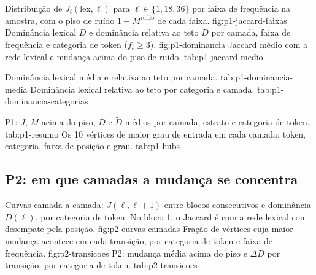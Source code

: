     {Distribuição de $J_i(\mathrm{lex},\ell)$ para $\ell\in\{1,18,36\}$ por faixa de frequência
    na amostra, com o piso de ruído $1-M^{\text{ruído}}$ de cada faixa.}
    {fig:p1-jaccard-faixas}
    {Dominância lexical $D$ e dominância relativa ao teto $\tilde D$ por camada, faixa de
    frequência e categoria de token ($f_t\ge3$).}
    {fig:p1-dominancia}
    {Jaccard médio com a rede lexical e mudança acima do piso de ruído.}
    {tab:p1-jaccard-medio}

    {Dominância lexical média e relativa ao teto por camada.}
    {tab:p1-dominancia-media}
    {Dominância lexical relativa ao teto por categoria e camada.}
    {tab:p1-dominancia-categorias}

    {P1: $J$, $M$ acima do piso, $D$ e $\tilde D$ médios por camada, estrato e categoria de
    token.}
    {tab:p1-resumo}
    {Os 10 vértices de maior grau de entrada em cada camada: token, categoria, faixa de
    posição e grau.}
    {tab:p1-hubs}

\subsection{P2: em que camadas a mudança se concentra}\label{sec:res-p2}


    {Curvas camada a camada: $J(\ell,\ell+1)$ entre blocos consecutivos e dominância
    $D(\ell)$, por categoria de token. No bloco 1, o Jaccard é com a rede lexical com
    desempate pela posição.}
    {fig:p2-curvas-camadas}
    {Fração de vértices cuja maior mudança acontece em cada transição, por categoria de token
    e faixa de frequência.}
    {fig:p2-transicoes}
    {P2: mudança média acima do piso e $\Delta D$ por transição, por categoria de token.}
    {tab:p2-transicoes}

